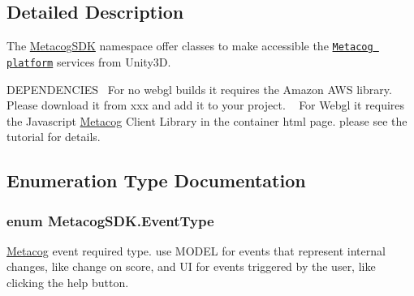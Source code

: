 \subsection{Detailed Description}
The \hyperlink{namespaceMetacogSDK}{Metacog\+S\+DK} namespace offer classes to make accessible the \href{}{\tt Metacog platform} services from Unity3D. 

D\+E\+P\+E\+N\+D\+E\+N\+C\+I\+ES~\newline
 For no webgl builds it requires the Amazon A\+WS library. Please download it from xxx and add it to your project. ~\newline
 For Webgl it requires the Javascript \hyperlink{classMetacogSDK_1_1Metacog}{Metacog} Client Library in the container html page. please see the tutorial for details.  

\subsection{Enumeration Type Documentation}
\subsubsection[{\texorpdfstring{Event\+Type}{EventType}}]{\setlength{\rightskip}{0pt plus 5cm}enum {\bf Metacog\+S\+D\+K.\+Event\+Type}\hspace{0.3cm}{\ttfamily [strong]}}\hypertarget{namespaceMetacogSDK_a9a46be6b2e98a6ae7460c93faf69728e}{}\label{namespaceMetacogSDK_a9a46be6b2e98a6ae7460c93faf69728e}


\hyperlink{classMetacogSDK_1_1Metacog}{Metacog} event required type. use M\+O\+D\+EL for events that represent internal changes, like change on score, and UI for events triggered by the user, like clicking the help button. 

